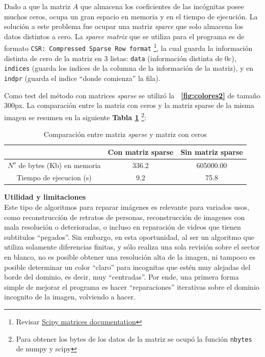 \documentclass[letterpaper,10.7pt]{article}
\newcommand{\figref}[1]{\figurename~\ref{#1}}
\begin{document}
Dado a que la matriz $A$ que almacena los coeficientes de las incógnitas posee muchos ceros, ocupa un gran espacio en memoria y en el tiempo de ejecución.
La solución a este problema fue ocupar una matriz \textit{sparce} que solo almacena los datos distintos a cero. La \textit{sparce matrix} que se utiliza para el programa es de formato \texttt{CSR: Compressed Sparse Row format} \footnote{Revisar \href{https://docs.scipy.org/doc/scipy/reference/sparse.html}{Scipy matrices documentation}}, la cual guarda la información distinta de cero de la matriz en 3 listas: \texttt{data} (información distinta de 0c), \texttt{indices} (guarda los indices de la columna de la información de la matriz), y en \texttt{indpr} (guarda el indice ``donde comienza'' la fila).

Como test del método con matrices \textit{sparse} se utilizó la \textbf{\figref{fig:colores2}} de tamaño 300px. La comparación entre la matriz con ceros y la matriz sparse de la misma imagen se resumen en la siguiente \textbf{Tabla \ref{tab:compare}} \footnote{Para obtener los bytes de los datos de la matriz se ocupó la función \texttt{nbytes} de numpy y scipy}:

\begin{table}[htbp]
  \centering
    \begin{tabular}{|c|c|c|}
    \hline
    \multicolumn{1}{|c|}{} & Con matriz sparse & Sin matriz sparse \\
    \hline
    $N^{o}$ de bytes (Kb) en memoria & 336.2 & 605000.00  \\
    \hline
    Tiempo de ejecucion (s) & 9.2   & 75.8 \\
    \hline
    \end{tabular}%
   \caption{Comparación entre matriz \textit{sparse} y matriz con ceros}
  \label{tab:compare}%
\end{table}%

{\centering \textbf{{\Large Utilidad y limitaciones}}}\\

Este tipo de algoritmos para reparar imágenes es relevante para variados usos, como reconstrucción de retratos de personas, reconstrucción de imagenes con mala resolución o deterioradas, o incluso en reparación de videos que tienen subtitulos ``pegados''. Sin embargo, en esta oportunidad, al ser un algoritmo que utiliza solamente diferencias finitas, y sólo realiza una sola revisión sobre el sector en blanco, no es posible obtener una resolución alta de la imagen, ni tampoco es posible determinar un color ``claro'' para incognitas que estén muy alejadas del borde del dominio, es decir, muy ``centradas''. Por ende, una primera forma simple de mejorar el programa es hacer ``reparaciones'' iterativas sobre el dominio incognito de la imagen, volviendo a hacer.\\
\end{document}
